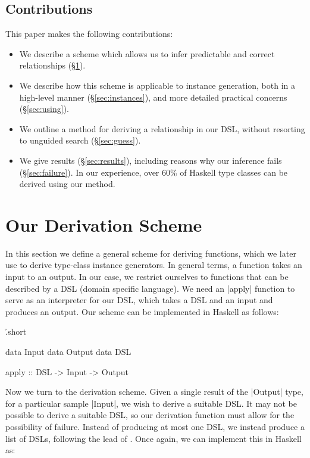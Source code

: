 \documentclass[preprint,draft]{sigplanconf}
\begin{document}
\subsection{Contributions}

This paper makes the following contributions:

\begin{itemize}
\item We describe a scheme which allows us to infer predictable and correct relationships (\S\ref{sec:scheme}).
\item We describe how this scheme is applicable to instance generation, both in a high-level manner (\S\ref{sec:instances}), and more detailed practical concerns (\S\ref{sec:using}).
\item We outline a method for deriving a relationship in our DSL, without resorting to unguided search (\S\ref{sec:guess}).
\item We give results (\S\ref{sec:results}), including reasons why our inference fails (\S\ref{sec:failure}). In our experience, over 60\% of Haskell type classes can be derived using our method.
\end{itemize}

\section{Our Derivation Scheme}
\label{sec:scheme}

In this section we define a general scheme for deriving functions, which we later use to derive type-class instance generators. In general terms, a function takes an input to an output. In our case, we restrict ourselves to functions that can be described by a DSL (domain specific language). We need an |apply| function to serve as an interpreter for our DSL, which takes a DSL and an input and produces an output. Our scheme can be implemented in Haskell as follows:

\h{.short}\begin{code}
data Input
data Output
data DSL

apply :: DSL -> Input -> Output
\end{code}

Now we turn to the derivation scheme. Given a single result of the |Output| type, for a particular sample |Input|, we wish to derive a suitable DSL. It may not be possible to derive a suitable DSL, so our derivation function must allow for the possibility of failure. Instead of producing at most one DSL, we instead produce a list of DSLs, following the lead of \citet{wadler:list_of_successes}. Once again, we can implement this in Haskell as:
\end{document}
